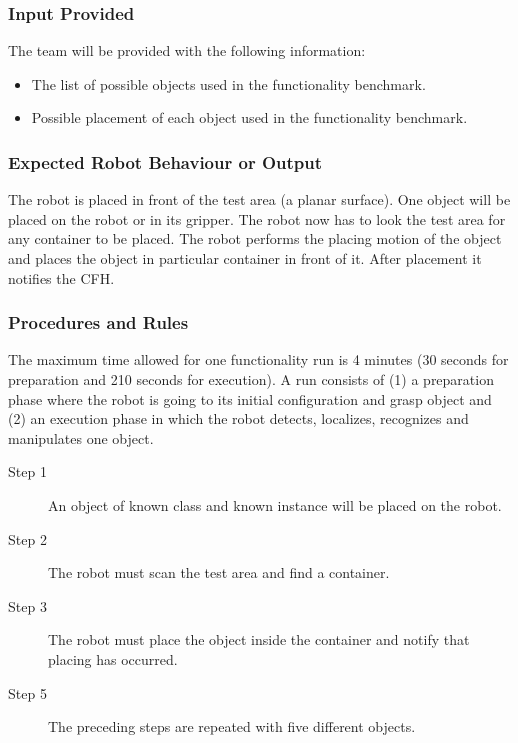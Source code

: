 \subsubsection{Input Provided}
\label{sssec:FBMManipulationPlaceInput}

The team will be provided with the following information:
\begin{itemize}
	\item The list of possible objects used in the functionality benchmark.
	\item Possible placement of each object used in the functionality benchmark.
\end{itemize}

\subsubsection{Expected Robot Behaviour or Output}
\label{sssec:FBMManipulationPlaceOutput}

The robot is placed in front of the test area (a planar surface).
One object will be placed on the robot or in its gripper.
The robot now has to look the test area for any container to be placed.
The robot performs the placing motion of the object and places the object in particular container in front of it.
After placement it notifies the CFH.



\subsubsection{Procedures and Rules}
\label{sssec:FBMManipulationPlaceProcedures}

The maximum time allowed for one functionality run is 4 minutes (30 seconds for preparation and 210 seconds for execution). A run consists of (1) a preparation phase where the robot is going to its initial configuration and  grasp object and (2) an execution phase in which the robot detects, localizes, recognizes and manipulates one object.

\begin{description}
\item[Step 1] An object of known class and known instance will be placed on the robot.
\item[Step 2] The robot must scan the test area and find a container.
\item[Step 3] The robot must place the object inside the container and notify that placing has occurred.
\item[Step 5] The preceding steps are repeated with five different objects.
\end{description} 


